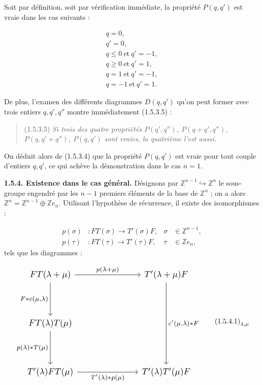 %
Soit par définition, soit par vérification immédiate, la propriété
$P(q,q')$ est vraie dans les cas suivants :

\begin{equation}
  \begin{gathered}
    q=0,\\
    q'=0,\\
    q\leq 0\ \text{et}\ q'=-1,\\
    q\geq 0\ \text{et}\ q'=1,\\
    q=1\ \text{et}\ q'=-1,\\
    q=-1\ \text{et}\ q'=1.
  \end{gathered}
  \tag{1.5.3.4}
\end{equation}

De plus, l'examen des différents diagrammes $D(q,q')$ qu'on peut
former avec trois entiers $q,q',q''$ montre immédiatement (1.5.3.5) :

\begin{quote}
  \noindent\textup{(1.5.3.5)}\quad
  \emph{Si trois des quatre propriétés
  $P(q',q'')$, $P(q+q',q'')$, $P(q,q'+q'')$, $P(q,q')$ sont vraies,
  la quatrième l'est aussi.}
\end{quote}

On déduit alors de (1.5.3.4) que la propriété $P(q,q')$ est vraie
pour tout couple d'entiers $q,q'$, ce qui achève la démonstration dans
le cas $n=1$.

\noindent\textbf{1.5.4. Existence dans le cas général.}\quad
Désignons par $\mathbb Z^{n-1}\hookrightarrow\mathbb Z^n$ le
sous-groupe engendré par les $n-1$ premiers éléments de la base de
$\mathbb Z^n$ ; on a alors
$\mathbb Z^n=\mathbb Z^{n-1}\oplus\mathbb Z e_n$.
Utilisant l'hypothèse de récurrence, il existe des isomorphismes :

\[
  \begin{aligned}
    p(\sigma)&\colon FT(\sigma)\longrightarrow T'(\sigma)F,
      &\sigma&\in\mathbb Z^{n-1},\\
    p(\tau)&\colon FT(\tau)\longrightarrow T'(\tau)F,
      &\tau&\in\mathbb Z e_n,
  \end{aligned}
\]
tels que les diagrammes :

\begin{equation}
  \resizebox{0.76\textwidth}{!}{%
    $\begin{tikzcd}[ampersand replacement=\&,column sep=7.0em,row sep=3.8em]
      FT(\lambda+\mu)
        \arrow[r,"{p(\lambda+\mu)}"]
        \arrow[d,"{F*c(\mu,\lambda)}"']
        \& T'(\lambda+\mu)F
        \arrow[dd,"{c'(\mu,\lambda)*F}"] \\
      FT(\lambda)T(\mu)
        \arrow[d,"{p(\lambda)*T(\mu)}"']
        \& {} \\
      T'(\lambda)FT(\mu)
        \arrow[r,"{T'(\lambda)*p(\mu)}"']
        \& T'(\lambda)T'(\mu)F
    \end{tikzcd}$%
  }
  \tag*{\(\textup{(1.5.4.1)}_{\lambda,\mu}\)}
\end{equation}
